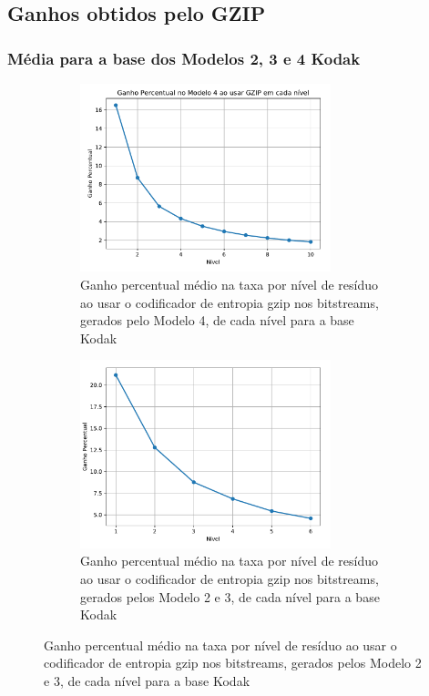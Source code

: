 \documentclass{beamer}
\begin{document}
\subsection{Ganhos obtidos pelo GZIP}
\begin{frame}
\frametitle{Média para a base dos Modelos 2, 3 e 4 Kodak~\cite{kodak}}
\begin{figure}
\begin{subfigure}{.5\textwidth}
    \centering
    \includegraphics[width=0.8\textwidth]{figs/gain_gzip_mod4.pdf}
    \caption{Ganho percentual médio na taxa por nível de resíduo ao usar o codificador de entropia gzip nos bitstreams, gerados pelo Modelo 4, de cada nível para a base Kodak~\cite{kodak}}
\end{subfigure}%
\begin{subfigure}{.5\textwidth}
  \centering
  \includegraphics[width=0.8\textwidth]{figs/plot_gzip_model.pdf}
  \caption{Ganho percentual médio na taxa por nível de resíduo ao usar o codificador de entropia gzip nos bitstreams, gerados pelos Modelo 2 e 3, de cada nível para a base Kodak~\cite{kodak}}
\end{subfigure}
\end{figure}
\end{frame}
\end{document}
